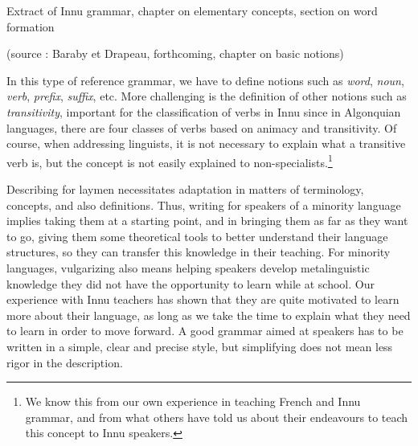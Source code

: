 \ea Extract of Innu grammar, chapter on elementary concepts, section on word formation



(source : Baraby et Drapeau, forthcoming, chapter on basic notions)
\z


In this type of reference grammar, we have to define notions such as \textit{word}, \textit{noun}, \textit{verb}, \textit{prefix}, \textit{suffix}, etc. More challenging is the definition of other notions such as \textit{transitivity}, important for the classification of verbs in Innu since in Algonquian languages, there are four classes of verbs based on animacy and transitivity. Of course, when addressing linguists, it is not necessary to explain what a transitive verb is, but the concept is not easily explained to non-specialists.\footnote{We
 know this from our own experience in teaching French and Innu grammar, and from what others have told us about their endeavours to teach this concept to Innu speakers.
}

Describing for laymen necessitates adaptation in matters of terminology, concepts, and also definitions. Thus, writing for speakers of a minority language implies taking them at a starting point, and in bringing them as far as they want to go, giving them some theoretical tools to better understand their language structures, so they can transfer this knowledge in their teaching. For minority languages, vulgarizing also means helping speakers develop metalinguistic knowledge they did not have the opportunity to learn while at school. Our experience with Innu teachers has shown that they are quite motivated to learn more about their language, as long as we take the time to explain what they need to learn in order to move forward. A good grammar aimed at speakers has to be written in a simple, clear and precise style, but simplifying does not mean less rigor in the description. 

